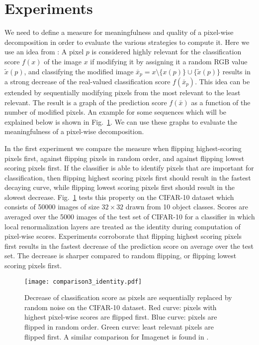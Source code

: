 \documentclass[runningheads,a4paper]{llncs}
\begin{document}
\section{Experiments}
\label{sec:experiments}
We need to define a measure for meaningfulness and quality of a pixel-wise decomposition in order to evaluate the various strategies to compute it. Here we use an idea from \cite{DBLP:journals/corr/SamekBMBM15}: A pixel $p$ is considered highly relevant for the classification score $f(x)$ of the image $x$ if modifying it by assigning it a random RGB value $\tilde{x}(p)$, and classifying the modified image $\bar{x}_{p}= x \setminus\{x(p)\} \cup \{\tilde{x}(p)\}$ results in a strong decrease of the real-valued classification score $f(\bar{x}_{p})$. This idea can be extended by sequentially modifying pixels from the most relevant to the least relevant. The result is a graph of the prediction score $f(\bar{x})$ as a function of the number of modified pixels. An example for some sequences which will be explained below is shown in Fig.~\ref{fig:threeflippingtypes}. 
We can use these graphs to evaluate the meaningfulness of a pixel-wise decomposition.

In the first experiment we compare the measure when flipping highest-scoring pixels first, against flipping pixels in random order, and against flipping lowest scoring pixels first. If the classifier is able to identify pixels that are important for classification, then flipping highest scoring pixels first should result in the fastest decaying curve, while flipping lowest scoring pixels first should result in the slowest decrease. Fig.~\ref{fig:threeflippingtypes} tests this property on the CIFAR-10 dataset \cite{CIFAR-10} which consists of 50000 images of size $32\times 32$ drawn from 10 object classes. Scores are averaged over the 5000 images of the test set of CIFAR-10 for a classifier in which local renormalization layers are treated as the identity during computation of pixel-wise scores. Experiments corroborate that flipping highest scoring pixels first results in the fastest decrease of the prediction score on average over the test set. The decrease is sharper compared to random flipping, or flipping lowest scoring pixels first.

\begin{figure}[t]
\centering
\texttt{[image: comparison3\_identity.pdf]}
\caption{\label{fig:threeflippingtypes}Decrease of classification score as pixels are sequentially replaced by random noise on the CIFAR-10 dataset. Red curve: pixels with highest pixel-wise scores are flipped first. Blue curve: pixels are flipped in random order. Green curve: least relevant pixels are flipped first. A similar comparison for Imagenet is found in \cite{DBLP:journals/corr/SamekBMBM15}.}
\end{figure}
\end{document}
